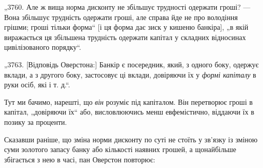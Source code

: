 „3760. Але ж вища норма дисконту не збільшує трудності
одержати гроші? — Вона збільшує трудність одержати гроші, але
справа йде не про володіння грішми; гроші тільки форма“ [і ця
форма дає зиск у кишеню банкіра], „в якій виражається ця збільшена трудність одержати капітал у
складних відносинах цивілізованого порядку“.

„3763. [Відповідь Оверстона:] Банкір є посередник, який,
з одного боку, одержує вклади, а з другого боку, застосовує
ці вклади, довіряючи їх у \emph{формі капіталу} в руки осіб, які
і т. д.“.

Тут ми бачимо, нарешті, що \emph{він} розуміє під капіталом. Він
перетворює гроші в капітал, „довіряючи їх“ або, висловлюючись
менш евфемістично, віддаючи їх в позику за проценти.

Сказавши раніше, що зміна норми дисконту по суті не стоїть
у зв’язку із зміною суми золотого запасу банку або кількості
наявних грошей, а щонайбільше збігається з нею в часі, пан
Оверстон повторює:
